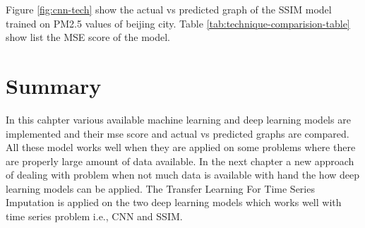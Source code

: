 Figure \ref{fig:cnn-tech} show the actual vs predicted graph of the SSIM model trained on PM2.5 values of beijing city. Table \ref{tab:technique-comparision-table} show list the MSE score of the model.

\section{Summary}
In this cahpter various available machine learning and deep learning models are implemented and their mse score and actual vs predicted graphs are compared. All these model works well when they are applied on some problems where there are properly large amount of data available. In the next chapter a new approach of dealing with problem when not much data is available with hand the how deep learning models can be applied. The Transfer Learning For Time Series Imputation is applied on the two deep learning models which works well with time series problem i.e., CNN and SSIM. 